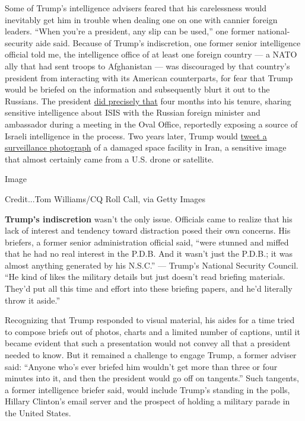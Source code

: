 Some of Trump's intelligence advisers feared that his carelessness would
inevitably get him in trouble when dealing one on one with cannier
foreign leaders. ``When you're a president, any slip can be used,'' one
former national-security aide said. Because of Trump's indiscretion, one
former senior intelligence official told me, the intelligence office of
at least one foreign country --- a NATO ally that had sent troops to
Afghanistan --- was discouraged by that country's president from
interacting with its American counterparts, for fear that Trump would be
briefed on the information and subsequently blurt it out to the
Russians. The president
\href{https://www.nytimes.com/2017/05/15/us/politics/trump-russia-classified-information-isis.html}{did
precisely that} four months into his tenure, sharing sensitive
intelligence about ISIS with the Russian foreign minister and ambassador
during a meeting in the Oval Office, reportedly exposing a source of
Israeli intelligence in the process. Two years later, Trump would
\href{https://www.nytimes.com/2019/08/30/world/middleeast/trump-iran-missile-explosion-satellite-image.html}{tweet
a surveillance photograph} of a damaged space facility in Iran, a
sensitive image that almost certainly came from a U.S. drone or
satellite.

Image

Credit...Tom Williams/CQ Roll Call, via Getty Images

\textbf{Trump's indiscretion} wasn't the only issue. Officials came to
realize that his lack of interest and tendency toward distraction posed
their own concerns. His briefers, a former senior administration
official said, ``were stunned and miffed that he had no real interest in
the P.D.B. And it wasn't just the P.D.B.; it was almost anything
generated by his N.S.C.'' --- Trump's National Security Council. ``He
kind of likes the military details but just doesn't read briefing
materials. They'd put all this time and effort into these briefing
papers, and he'd literally throw it aside.''

Recognizing that Trump responded to visual material, his aides for a
time tried to compose briefs out of photos, charts and a limited number
of captions, until it became evident that such a presentation would not
convey all that a president needed to know. But it remained a challenge
to engage Trump, a former adviser said: ``Anyone who's ever briefed him
wouldn't get more than three or four minutes into it, and then the
president would go off on tangents.'' Such tangents, a former
intelligence briefer said, would include Trump's standing in the polls,
Hillary Clinton's email server and the prospect of holding a military
parade in the United States.

